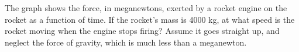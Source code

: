 \answercheck The graph shows the force, in meganewtons, exerted
by a rocket engine on the rocket as a function of time. If
the rocket's mass is 4000 kg, at what speed is the rocket
moving when the engine stops firing? Assume it goes straight
up, and neglect the force of gravity, which is much
less than a meganewton.
